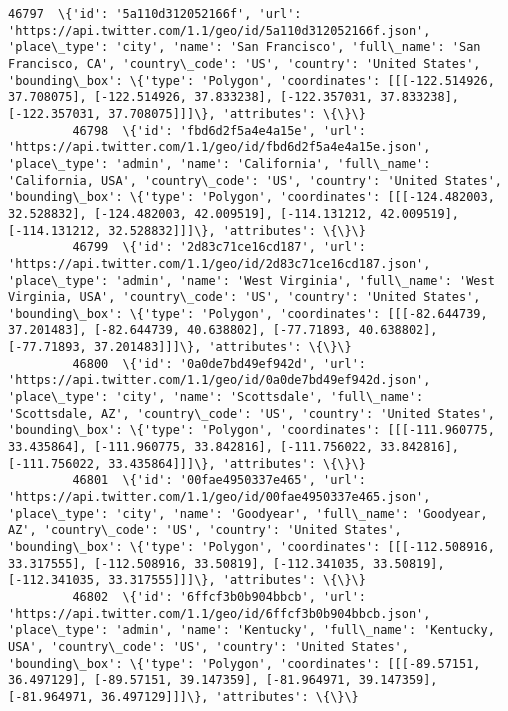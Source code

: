 \documentclass[11pt]{article}
\begin{document}
\begin{Verbatim}[commandchars=\\\{\}]
         46797  \{'id': '5a110d312052166f', 'url': 'https://api.twitter.com/1.1/geo/id/5a110d312052166f.json', 'place\_type': 'city', 'name': 'San Francisco', 'full\_name': 'San Francisco, CA', 'country\_code': 'US', 'country': 'United States', 'bounding\_box': \{'type': 'Polygon', 'coordinates': [[[-122.514926, 37.708075], [-122.514926, 37.833238], [-122.357031, 37.833238], [-122.357031, 37.708075]]]\}, 'attributes': \{\}\}         
         46798  \{'id': 'fbd6d2f5a4e4a15e', 'url': 'https://api.twitter.com/1.1/geo/id/fbd6d2f5a4e4a15e.json', 'place\_type': 'admin', 'name': 'California', 'full\_name': 'California, USA', 'country\_code': 'US', 'country': 'United States', 'bounding\_box': \{'type': 'Polygon', 'coordinates': [[[-124.482003, 32.528832], [-124.482003, 42.009519], [-114.131212, 42.009519], [-114.131212, 32.528832]]]\}, 'attributes': \{\}\}             
         46799  \{'id': '2d83c71ce16cd187', 'url': 'https://api.twitter.com/1.1/geo/id/2d83c71ce16cd187.json', 'place\_type': 'admin', 'name': 'West Virginia', 'full\_name': 'West Virginia, USA', 'country\_code': 'US', 'country': 'United States', 'bounding\_box': \{'type': 'Polygon', 'coordinates': [[[-82.644739, 37.201483], [-82.644739, 40.638802], [-77.71893, 40.638802], [-77.71893, 37.201483]]]\}, 'attributes': \{\}\}             
         46800  \{'id': '0a0de7bd49ef942d', 'url': 'https://api.twitter.com/1.1/geo/id/0a0de7bd49ef942d.json', 'place\_type': 'city', 'name': 'Scottsdale', 'full\_name': 'Scottsdale, AZ', 'country\_code': 'US', 'country': 'United States', 'bounding\_box': \{'type': 'Polygon', 'coordinates': [[[-111.960775, 33.435864], [-111.960775, 33.842816], [-111.756022, 33.842816], [-111.756022, 33.435864]]]\}, 'attributes': \{\}\}               
         46801  \{'id': '00fae4950337e465', 'url': 'https://api.twitter.com/1.1/geo/id/00fae4950337e465.json', 'place\_type': 'city', 'name': 'Goodyear', 'full\_name': 'Goodyear, AZ', 'country\_code': 'US', 'country': 'United States', 'bounding\_box': \{'type': 'Polygon', 'coordinates': [[[-112.508916, 33.317555], [-112.508916, 33.50819], [-112.341035, 33.50819], [-112.341035, 33.317555]]]\}, 'attributes': \{\}\}                     
         46802  \{'id': '6ffcf3b0b904bbcb', 'url': 'https://api.twitter.com/1.1/geo/id/6ffcf3b0b904bbcb.json', 'place\_type': 'admin', 'name': 'Kentucky', 'full\_name': 'Kentucky, USA', 'country\_code': 'US', 'country': 'United States', 'bounding\_box': \{'type': 'Polygon', 'coordinates': [[[-89.57151, 36.497129], [-89.57151, 39.147359], [-81.964971, 39.147359], [-81.964971, 36.497129]]]\}, 'attributes': \{\}\}                       

\end{Verbatim}
\end{document}
